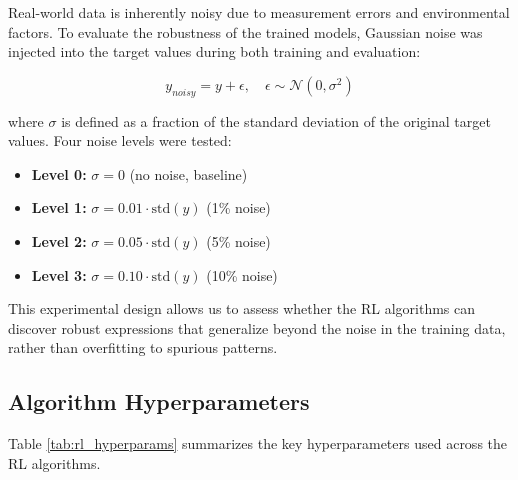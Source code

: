 Real-world data is inherently noisy due to measurement errors and environmental factors. To evaluate the robustness of the trained models, Gaussian noise was injected into the target values during both training and evaluation:

\begin{equation}
    y_{noisy} = y + \epsilon, \quad \epsilon \sim \mathcal{N}(0, \sigma^2)
\end{equation}

where $\sigma$ is defined as a fraction of the standard deviation of the original target values. Four noise levels were tested:

\begin{itemize}
    \item \textbf{Level 0:} $\sigma = 0$ (no noise, baseline)
    \item \textbf{Level 1:} $\sigma = 0.01 \cdot \text{std}(y)$ (1\% noise)
    \item \textbf{Level 2:} $\sigma = 0.05 \cdot \text{std}(y)$ (5\% noise)
    \item \textbf{Level 3:} $\sigma = 0.10 \cdot \text{std}(y)$ (10\% noise)
\end{itemize}

This experimental design allows us to assess whether the RL algorithms can discover robust expressions that generalize beyond the noise in the training data, rather than overfitting to spurious patterns.

\subsection{Algorithm Hyperparameters}

Table \ref{tab:rl_hyperparams} summarizes the key hyperparameters used across the RL algorithms.

